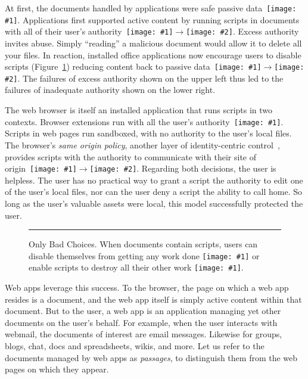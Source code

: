 \documentclass[letterpaper,twocolumn,10pt]{article}
\newcommand{\q}[1]{{\texttt{[image: \#1]}}}
\newcommand{\qq}[2]{{\texttt{[image: \#1]}}$\rightarrow${\texttt{[image: \#2]}}}
\begin{document}
At first, the documents handled by applications were safe passive data~\q{1}. 
Applications first supported active content by running scripts in documents 
with all of their user's authority~\qq{1}{2}. Excess authority invites abuse. 
Simply ``reading'' a malicious document would allow it to delete all your 
files. In reaction, installed office applications now encourage users to 
disable scripts (Figure~\ref{fig:dialog}) reducing content back to passive 
data~\qq{2}{1}. The failures of excess authority shown on the upper left thus 
led to the failures of inadequate authority shown on the lower right.

The web browser is itself an installed application that runs scripts in two 
contexts. Browser extensions run with all the user's authority~\q{2}. Scripts 
in web pages run sandboxed, with no authority to the user's local files. The 
browser's \emph{same origin policy}, another layer of identity-centric 
control~\cite{mashupos}, provides scripts with the authority to communicate 
with their site of origin~\qq{1}{3}. Regarding both decisions, the user is 
helpless. The user has no practical way to grant a script the authority to 
edit one of the user's local files, nor can the user deny a script the 
ability to call home. So long as the user's valuable assets were local, this 
model successfully protected the user.

\begin{figure}[t!]
  
\caption[Only Bad Choices.]{Only Bad Choices. When documents contain scripts, 
users can disable themselves from getting any work done \q{1} or enable 
scripts to destroy all their other work \q{2}. \\ } \hrule
  \label{fig:dialog}
\end{figure}

Web apps leverage this success. To the browser, the page on which a web app 
resides is a document, and the web app itself is simply active content within 
that document. But to the user, a web app is an application managing yet 
other documents on the user's behalf. For example, when the user interacts 
with webmail, the documents of interest are email messages. Likewise for 
groups, blogs, chat, docs and spreadsheets, wikis, and more. Let us refer to 
the documents managed by web apps as \emph{passages}, to distinguish them 
from the web pages on which they appear.
\end{document}
